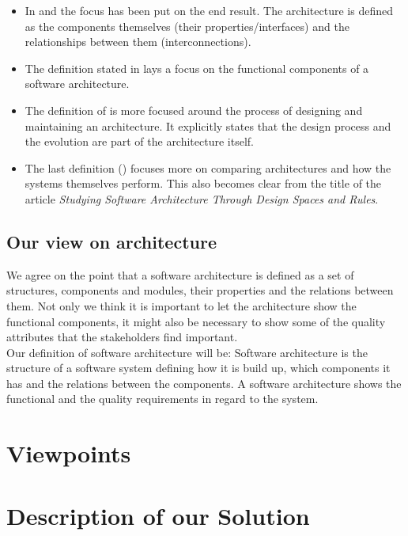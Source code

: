 \documentclass{article}
\begin{document}
\begin{itemize}
\item In \cite{clemens} and \cite{hayesroth} the focus has been put on the end result. The architecture is defined as the components themselves (their properties/interfaces) and the relationships between them (interconnections).
\item The definition stated in \cite{hayesroth} lays a focus on the functional components of a software architecture.
\item The definition of \cite{IEEE1471} is more focused around the process of
designing and maintaining an architecture. It explicitly states that the design
process and the evolution are part of the architecture itself.
\item The last definition (\cite{lane90}) focuses more on comparing
architectures and how the systems themselves perform. This also becomes clear
from the title of the article \emph{Studying Software Architecture Through
Design Spaces and Rules}.

\end{itemize}

\subsection{Our view on architecture}

We agree on the point that a software architecture is defined as a set of
structures, components and modules, their properties and the relations
between them. 
Not only we think it is important to let the architecture show the functional components, it might also be necessary to show some of the quality attributes that the stakeholders find important. \\ 

Our definition of software architecture will be:
Software architecture is the structure of a software system defining how it is
build up, which components it has and the relations between the components. 
A software architecture shows the functional and the quality requirements in
regard to the system.



\section{Viewpoints}



\section{Description of our Solution}
\end{document}
